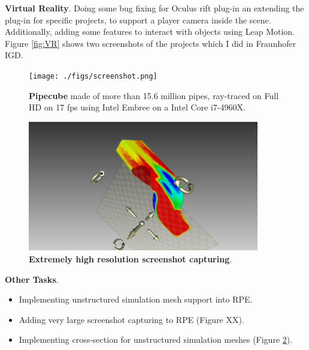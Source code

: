\documentclass[]{report}
\begin{document}
\textbf{Virtual Reality}. Doing some bug fixing for Oculus rift plug-in an extending the plug-in for specific projects, to support a player camera inside the scene. Additionally, adding some features to interact with objects using Leap Motion. Figure \ref{fig:VR} shows two screenshots of the projects which I did in Fraunhofer IGD. 



\begin{figure}[!ht]
	\centering
	\texttt{[image: ./figs/screenshot.png]}
	\caption[Pipecube]{\textbf{Pipecube} made of more than 15.6 million pipes, ray-traced on Full HD on 17 fps using Intel Embree on a Intel Core i7-4960X.}
	\label{fig:pipecube}
\end{figure}


\begin{figure}[!ht]
	\centering
	\includegraphics[width=0.90\textwidth]{./figs/crosssection.png}
	\caption[Extremely high resolution screenshot capturing]{\textbf{Extremely high resolution screenshot capturing}.}
	\label{fig:crosssection}
\end{figure}



\textbf{Other Tasks}.
\begin{itemize}
	\item Implementing unstructured simulation mesh support into RPE.
	\item Adding very large screenshot capturing to RPE (Figure XX).
	\item Implementing cross-section for unstructured simulation meshes (Figure \ref{fig:crosssection}).
\end{itemize}
 
\end{document}
